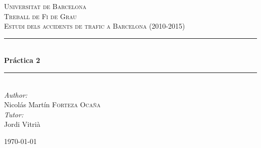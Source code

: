 \begin{titlepage}

\newcommand{\HRule}{\rule{\linewidth}{0.5mm}} %

\center %
 

\textsc{\LARGE Universitat de Barcelona}\\[1.5cm] %
\textsc{\Large Treball de Fi de Grau}\\[0.5cm] %
\textsc{\large Estudi dels accidents de trafic a Barcelona (2010-2015)}\\[0.5cm] %


\HRule \\[0.4cm]
{ \huge \bfseries Práctica 2}\\[0.4cm] %
\HRule \\[1.5cm]
 



\Large \emph{Author:}\\
Nicolás Martín \textsc{Forteza Ocaña}\\[3cm] %
\Large \emph{Tutor:}\\
Jordi Vitrià


{\large \today}\\[3cm] %


 

\vfill %

\end{titlepage}

